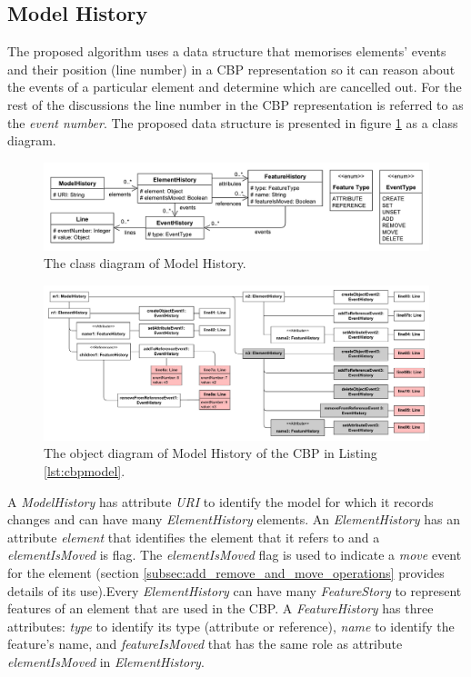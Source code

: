 \documentclass{llncs}
\begin{document}
\subsection{Model History}
\label{subsec:model_history}
The proposed algorithm uses a data structure that memorises elements' events and their position (line number) in a CBP representation so it can reason about the events of a particular element and determine which are cancelled out.
For the rest of the discussions the line number in the CBP representation is referred to as the \emph{event number}. The proposed data structure is presented in figure \ref{fig:object_history} as a class diagram.  


\begin{figure}[ht]
\centering
\includegraphics[width=\linewidth]{object_history}
\caption{The class diagram of Model History.}
\label{fig:object_history}
\end{figure}

\begin{figure}[ht]
\centering
\includegraphics[width=\linewidth]{history_structure}
\caption{The object diagram of Model History of the CBP in Listing \ref{lst:cbpmodel}.}
\label{fig:history_structure}
\end{figure}

A \emph{ModelHistory} has attribute \emph{URI} to identify the model for which it records changes and can have many \emph{ElementHistory} elements. An \emph{ElementHistory} has an attribute \emph{element} that identifies the element that it refers to and a \emph{elementIsMoved} is flag. The  \emph{elementIsMoved} flag is used to indicate a \emph{move} event for the element (section \ref{subsec:add_remove_and_move_operations} provides details of its use).Every \emph{ElementHistory} can have many \emph{FeatureStory} to represent features of an element that are used in the CBP. 
A \emph{FeatureHistory} has three attributes: \emph{type} to identify its type (attribute or reference), \emph{name} to identify the feature's name, and \emph{featureIsMoved} that has the same role as attribute \emph{elementIsMoved} in  \emph{ElementHistory}.
\end{document}
